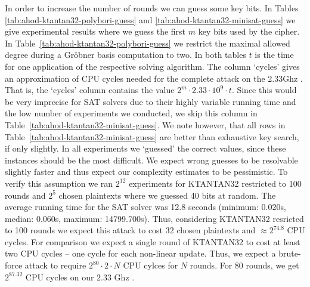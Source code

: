 In order to increase the number of rounds we can guess some key bits. In Tables \ref{tab:ahod-ktantan32-polybori-guess} and \ref{tab:ahod-ktantan32-minisat-guess} we give experimental results where we guess the first $m$ key bits used by the cipher. In Table~\ref{tab:ahod-ktantan32-polybori-guess} we restrict the maximal allowed degree during a Gröbner basis computation to two. In both tables $t$ is the time for one application of the respective solving algorithm. The column `cycles' gives an approximation of CPU cycles needed for the complete attack on the 2.33Ghz \CTD. That is, the `cycles' column contains the value $2^m \cdot 2.33 \cdot 10^9 \cdot t$.  Since this would be very imprecise for SAT solvers due to their highly variable running time and the low number of experiments we conducted, we skip this column in Table~\ref{tab:ahod-ktantan32-minisat-guess}. We note however, that all rows in Table~\ref{tab:ahod-ktantan32-minisat-guess} are better than exhaustive key search, if only slightly. In all experiments we `guessed' the correct values, since these instances should be the most difficult. We expect wrong guesses to be resolvable slightly faster and thus expect our complexity estimates to be pessimistic. To verify this assumption we ran $2^{12}$ experiments for KTANTAN32 restricted to 100 rounds and $2^5$ chosen plaintexts where we guessed 40 bits at random. The average running time for the SAT solver was 12.8 seconds (minimum: 0.020s, median: 0.060s, maximum: 14799.700s).  Thus, considering KTANTAN32 resricted to 100 rounds we expect this attack to cost 32 chosen plaintexts and $\approx 2^{74.8}$ CPU cycles. For comparison we expect a single round of KTANTAN32 to cost at least two CPU cycles -- one cycle for each non-linear update. Thus, we expect a brute-force attack to require $2^{80} \cdot 2 \cdot N$ CPU cylces for $N$ rounds. For 80 rounds, we get $2^{87.32}$ CPU cycles on our 2.33 Ghz \CTD. 

